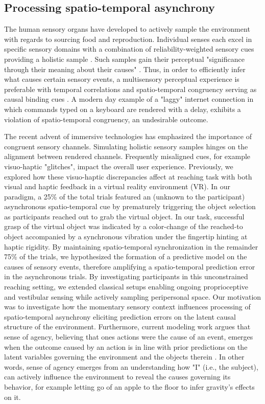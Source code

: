 \subsection{Processing spatio-temporal asynchrony}
The human sensory organs have developed to actively sample the environment with regards to sourcing food and reproduction. Individual senses each excel in specific sensory domains with a combination of reliability-weighted sensory cues providing a holistic sample \cite{Fetsch2012, Cao2019}. Such samples gain their perceptual "significance through their meaning about their causes" \cite{Kording2007}. Thus, in order to efficiently infer what causes certain sensory events, a multisensory perceptual experience is preferable with temporal correlations and spatio-temporal congruency serving as causal binding cues \cite{Robertson2003}. A modern day example of a "laggy" internet connection in which commands typed on a keyboard are rendered with a delay, exhibits a violation of spatio-temporal congruency, an undesirable outcome.



The recent advent of immersive technologies has emphasized the importance of congruent sensory channels. Simulating holistic sensory samples hinges on the alignment between rendered channels. Frequently misaligned cues, for example visuo-haptic "glitches", impact the overall user experience. Previously, we explored how these visuo-haptic discrepancies affect at  reaching task with both visual and haptic feedback in a virtual reality environment (VR)\cite{Gehrke2019}. In our paradigm, a 25\% of the total trials featured an (unknown to the participant) asynchronous spatio-temporal cue by prematurely triggering the object selection as participants reached out to grab the virtual object. In our task, successful grasp of the virtual object was indicated by a color-change of the reached-to object accompanied by a synchronous vibration under the fingertip hinting at haptic rigidity. By maintaining spatio-temporal synchronization in the remainder 75\% of the trials, we hypothesized the formation of a predictive model on the causes of sensory events, therefore amplifying a spatio-temporal prediction error in the asynchronous trials. By investigating participants in this unconstrained reaching setting, we extended classical setups enabling ongoing proprioceptive and vestibular sensing while actively sampling peripersonal space. Our motivation was to investigate how the momentary sensory context influences processing of spatio-temporal asynchrony eliciting prediction errors on the latent causal structure of the environment. Furthermore, current modeling work argues that sense of agency, believing that ones actions were the cause of an event, emerges when the outcome caused by an action is in line with prior predictions on the latent variables governing the environment and the objects therein \cite{Moore2016, Legaspi2019}. In other words, sense of agency emerges from an understanding how "I" (i.e., the subject), can actively influence the environment to reveal the causes governing its behavior, for example letting go of an apple to the floor to infer gravity's effects on it.



